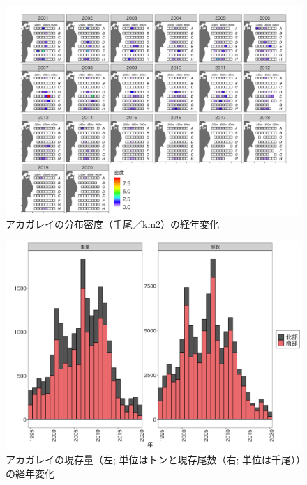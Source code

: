 \documentclass[11pt]{article} %
\begin{document}
\begin{linenumbers}
\begin{figure}[h]
  \centering
  \includegraphics[width = 14cm]{アカガレイdens.png}
  \caption{アカガレイの分布密度（千尾／km2）の経年変化}
\end{figure}

\begin{figure}[h]
  \centering
  \includegraphics[width = 14cm]{アカガレイtrend.png}
  \caption{アカガレイの現存量（左; 単位はトンと現存尾数（右; 単位は千尾））の経年変化}
\end{figure}


\end{linenumbers}
\end{document}
